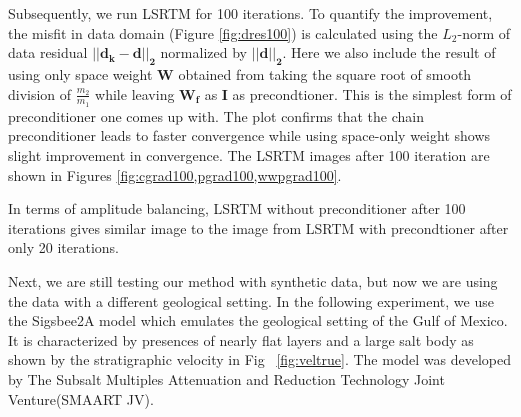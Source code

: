 
%

Subsequently, we run LSRTM for 100 iterations. To quantify the improvement, the misfit in data domain (Figure \ref{fig:dres100}) is calculated using the $L_2$-norm of data residual $\mathbf{|| d_k - d ||_{2}}$ normalized by $\mathbf{||d ||_{2}}$. Here we also include the result of using only space weight $\mathbf{W}$ obtained from taking the square root of smooth division of $\frac{m_2}{m_1}$ while leaving $\mathbf{W_f}$ as $\mathbf{I}$ as precondtioner. This is the simplest form of preconditioner one comes up with.
The plot confirms that the chain preconditioner leads to faster convergence while using space-only weight shows slight improvement in convergence. The LSRTM images after 100 iteration are shown in Figures \ref{fig:cgrad100,pgrad100,wwpgrad100}. 





In terms of amplitude balancing, LSRTM without preconditioner after 100 iterations gives similar image to the image from LSRTM with precondtioner after only 20 iterations.


Next, we are still testing our method with synthetic data, but now we are using the data with a different geological setting. In the following experiment, we use the Sigsbee2A model which emulates the geological setting of the Gulf of Mexico. It is characterized by presences of nearly flat layers and a large salt body as shown by the stratigraphic velocity in Fig ~\ref{fig:veltrue}. The model was developed by The  Subsalt  Multiples  Attenuation  and  Reduction  Technology  Joint  Venture(SMAART JV).

